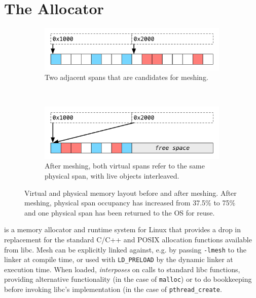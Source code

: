 \section{The \Mesh Allocator}
\label{sec:allocator}

\begin{figure}[!t]
  \centering
  \begin{subfigure}[t]{.5\textwidth}
    \centering
    \includegraphics[width=\textwidth]{figures/before_meshing}
    \caption{Two adjacent spans that are candidates for meshing.}
  \end{subfigure}%
  ~

  \begin{subfigure}[t]{.5\textwidth}
    \centering
    \includegraphics[width=\textwidth]{figures/after_meshing}
    \caption{After meshing, both virtual spans refer to the same
      physical \newline span, with live objects interleaved.}
  \end{subfigure}
  \caption{Virtual and physical memory layout before and after
    meshing.  After meshing, physical span occupancy has increased
    from 37.5\% to 75\% and one physical span has been returned to the
    OS for reuse.}
  \label{fig:meshing}
\end{figure}

\Mesh is a memory allocator and runtime system for Linux that provides
a drop in replacement for the standard C/C++ and POSIX allocation
functions available from libc.  Mesh can be explicitly linked against,
e.g. by passing \texttt{-lmesh} to the linker at compile time, or used
with \texttt{LD\_PRELOAD} by the dynamic linker at execution time.
When loaded, \Mesh \textit{interposes} on calls to standard libc
functions, providing alternative functionality (in the case of
\texttt{malloc}) or to do bookkeeping before invoking libc's
implementation (in the case of \texttt{pthread\_create}.

